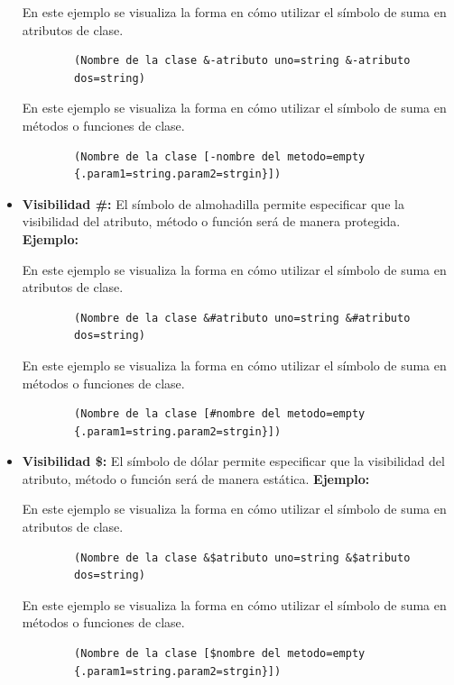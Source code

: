 \begin{itemize}
	En este ejemplo se visualiza la forma en cómo utilizar el símbolo de suma en atributos de clase.
	
	\begin{verbatim}
		(Nombre de la clase &-atributo uno=string &-atributo 
		dos=string)
	\end{verbatim}
	
	En este ejemplo se visualiza la forma en cómo utilizar el símbolo de suma en métodos o funciones de clase.
	
	\begin{verbatim}
		(Nombre de la clase [-nombre del metodo=empty
		{.param1=string.param2=strgin}])
	\end{verbatim}
	
	\item \textbf{Visibilidad \#: } El símbolo de almohadilla permite especificar que la visibilidad del atributo, método o función será de manera protegida. \textbf{Ejemplo:}
	
	En este ejemplo se visualiza la forma en cómo utilizar el símbolo de suma en atributos de clase.
	
	\begin{verbatim}
		(Nombre de la clase &#atributo uno=string &#atributo 
		dos=string)
	\end{verbatim}
	
	En este ejemplo se visualiza la forma en cómo utilizar el símbolo de suma en métodos o funciones de clase.
	
	\begin{verbatim}
		(Nombre de la clase [#nombre del metodo=empty
		{.param1=string.param2=strgin}])
	\end{verbatim}
	
	\item \textbf{Visibilidad \$: } El símbolo de dólar permite especificar que la visibilidad del atributo, método o función será de manera estática. \textbf{Ejemplo:}
	
	En este ejemplo se visualiza la forma en cómo utilizar el símbolo de suma en atributos de clase.
	
	\begin{verbatim}
		(Nombre de la clase &$atributo uno=string &$atributo 
		dos=string)
	\end{verbatim}
	
	En este ejemplo se visualiza la forma en cómo utilizar el símbolo de suma en métodos o funciones de clase.
	
	\begin{verbatim}
		(Nombre de la clase [$nombre del metodo=empty
		{.param1=string.param2=strgin}])
	\end{verbatim}
	

\end{itemize}
